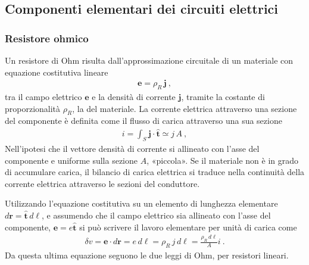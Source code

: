 \documentclass[letterpaper,10pt,italian]{jupyterBook}
\begin{document}
\subsection{Componenti elementari dei circuiti elettrici}
\label{\detokenize{ch/circuits-electric-components:componenti-elementari-dei-circuiti-elettrici}}\label{\detokenize{ch/circuits-electric-components:classical-electromagnetism-circuits-electric-components}}\label{\detokenize{ch/circuits-electric-components::doc}}

\subsubsection{Resistore ohmico}
\label{\detokenize{ch/circuits-electric-components:resistore-ohmico}}
\sphinxAtStartPar
Un resistore di Ohm risulta dall’approssimazione circuitale di un materiale con equazione costitutiva lineare
\begin{equation*}
\begin{split}\mathbf{e} = \rho_R \, \mathbf{j} \ ,\end{split}
\end{equation*}
\sphinxAtStartPar
tra il campo elettrico \(\mathbf{e}\) e la densità di corrente \(\mathbf{j}\), tramite la costante di proporzionalità \(\rho_R\), la  del materiale. La corrente elettrica attraverso una sezione del componente è definita come il flusso di carica attraverso una sua sezione
\begin{equation*}
\begin{split}i = \int_S \mathbf{j} \cdot \hat{\mathbf{t}} \simeq j \, A \ ,\end{split}
\end{equation*}
\sphinxAtStartPar
Nell’ipotesi che il vettore densità di corrente si allineato con l’asse del componente e uniforme sulla sezione \(A\), «piccola».
Se il materiale non è in grado di accumulare carica, il bilancio di carica elettrica si traduce nella continuità della corrente elettrica attraverso le sezioni del conduttore.

\sphinxAtStartPar
Utilizzando l’equazione costitutiva su un elemento di lunghezza elementare \(d\mathbf{r} =\hat{\mathbf{t}} \, d \ell \), e assumendo che il campo elettrico sia allineato con l’asse del componente, \(\mathbf{e} = e \hat{\mathbf{t}}\) si può scrivere il lavoro elementare per unità di carica come
\begin{equation*}
\begin{split}\delta v = \mathbf{e} \cdot d \mathbf{r} =  e \, d\ell = \rho_R \, j \, d\ell =  \frac{\rho_R \, d\ell}{A} i \ .\end{split}
\end{equation*}
\sphinxAtStartPar
Da questa ultima equazione seguono le due leggi di Ohm, per resistori lineari.
\end{document}
